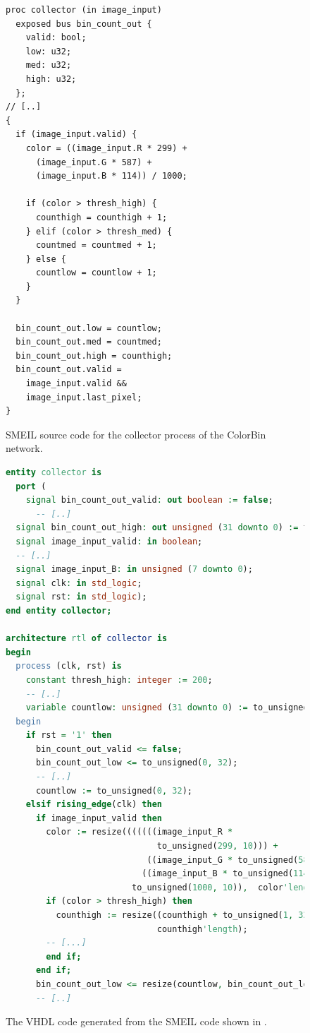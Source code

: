 \begin{figure}

\begin{lstlisting}[language=smeil,multicols=2]
proc collector (in image_input)
  exposed bus bin_count_out {
    valid: bool;
    low: u32;
    med: u32;
    high: u32;
  };
// [..]
{
  if (image_input.valid) {
    color = ((image_input.R * 299) +
      (image_input.G * 587) +
      (image_input.B * 114)) / 1000;

    if (color > thresh_high) {
      counthigh = counthigh + 1;
    } elif (color > thresh_med) {
      countmed = countmed + 1;
    } else {
      countlow = countlow + 1;
    }
  }

  bin_count_out.low = countlow;
  bin_count_out.med = countmed;
  bin_count_out.high = counthigh;
  bin_count_out.valid =
    image_input.valid &&
    image_input.last_pixel;
}
\end{lstlisting}
  \caption{SMEIL source code for the collector process of the ColorBin network.}
  \label{fig:collector}
\end{figure}

\begin{figure}[hb!]
\centerfloat
\begin{lstlisting}[language=vhdl]
entity collector is
  port (
    signal bin_count_out_valid: out boolean := false;
      -- [..]
  signal bin_count_out_high: out unsigned (31 downto 0) := to_unsigned(0, 32);
  signal image_input_valid: in boolean;
  -- [..]
  signal image_input_B: in unsigned (7 downto 0);
  signal clk: in std_logic;
  signal rst: in std_logic);
end entity collector;

architecture rtl of collector is
begin
  process (clk, rst) is
    constant thresh_high: integer := 200;
    -- [..]
    variable countlow: unsigned (31 downto 0) := to_unsigned(0, 32);
  begin
    if rst = '1' then
      bin_count_out_valid <= false;
      bin_count_out_low <= to_unsigned(0, 32);
      -- [..]
      countlow := to_unsigned(0, 32);
    elsif rising_edge(clk) then
      if image_input_valid then
        color := resize(((((((image_input_R *
                              to_unsigned(299, 10))) +
                            ((image_input_G * to_unsigned(587, 10)))) +
                           ((image_input_B * to_unsigned(114, 10))))) /
                         to_unsigned(1000, 10)),  color'length);
        if (color > thresh_high) then
          counthigh := resize((counthigh + to_unsigned(1, 32)),
                              counthigh'length);
        -- [...]
        end if;
      end if;
      bin_count_out_low <= resize(countlow, bin_count_out_low'length);
      -- [..]
\end{lstlisting}%
  \caption{The VHDL code generated from the SMEIL code shown in
    .}
  \label{fig:vhdlc}
\end{figure}

